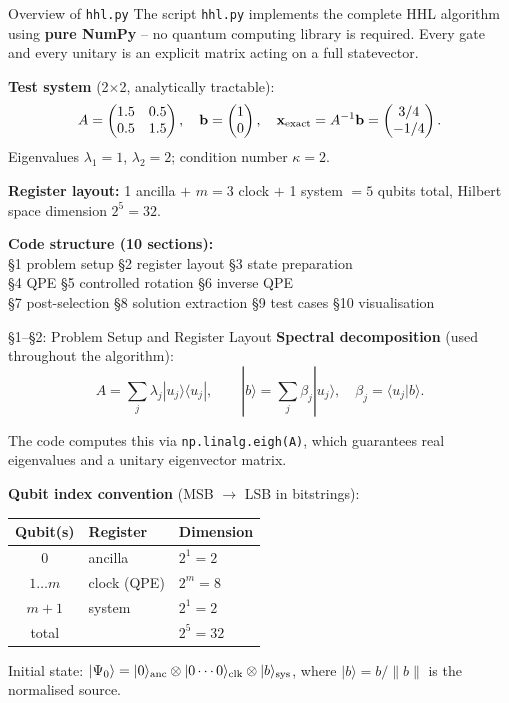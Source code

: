 \documentclass{beamer}
\begin{document}
\begin{frame}{Overview of \texttt{hhl.py}}
The script \texttt{hhl.py} implements the complete HHL algorithm
using \textbf{pure NumPy} -- no quantum computing library is required.
Every gate and every unitary is an explicit matrix acting on a full statevector.

\medskip
\textbf{Test system} (2$\times$2, analytically tractable):
\[
  A = \begin{pmatrix} 1.5 & 0.5 \\ 0.5 & 1.5 \end{pmatrix},
  \quad
  \mathbf{b} = \begin{pmatrix}1\\0\end{pmatrix},
  \quad
  \mathbf{x}_{\rm exact} = A^{-1}\mathbf{b} = \begin{pmatrix}3/4\\-1/4\end{pmatrix}.
\]
Eigenvalues $\lambda_1 = 1$, $\lambda_2 = 2$; condition number $\kappa = 2$.

\medskip
\textbf{Register layout:} 1 ancilla $+$ $m=3$ clock $+$ 1 system $= 5$ qubits total,
Hilbert space dimension $2^5 = 32$.

\medskip
\textbf{Code structure (10 sections):}\\
\S1 problem setup \quad \S2 register layout \quad \S3 state preparation\\
\S4 QPE \quad \S5 controlled rotation \quad \S6 inverse QPE\\
\S7 post-selection \quad \S8 solution extraction \quad \S9 test cases \quad \S10 visualisation
\end{frame}


\begin{frame}{\S1--\S2: Problem Setup and Register Layout}
\textbf{Spectral decomposition} (used throughout the algorithm):
\[
  A = \sum_j \lambda_j |u_j\rangle\langle u_j|,
  \qquad
  |b\rangle = \sum_j \beta_j |u_j\rangle,
  \quad \beta_j = \langle u_j | b\rangle.
\]

The code computes this via \texttt{np.linalg.eigh(A)}, which guarantees
real eigenvalues and a unitary eigenvector matrix.

\medskip
\textbf{Qubit index convention} (MSB $\to$ LSB in bitstrings):
\begin{center}
\small
\begin{tabular}{cll}
\toprule
Qubit(s) & Register & Dimension \\
\midrule
0 & ancilla & $2^1 = 2$ \\
$1 \ldots m$ & clock (QPE) & $2^m = 8$ \\
$m+1$ & system & $2^1 = 2$ \\
\midrule
total & & $2^5 = 32$ \\
\bottomrule
\end{tabular}
\end{center}

\medskip
Initial state:
$|\Psi_0\rangle = |0\rangle_{\rm anc} \otimes |0\cdots0\rangle_{\rm clk}
\otimes |b\rangle_{\rm sys}$,
where $|b\rangle = b/\|b\|$ is the normalised source.
\end{frame}
\end{document}
